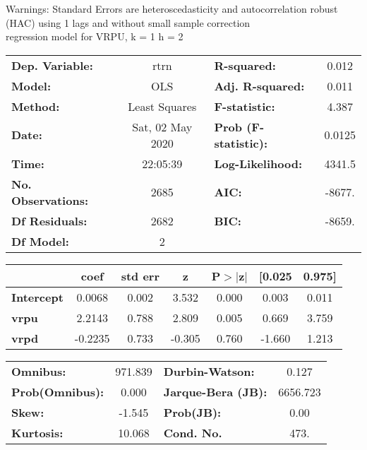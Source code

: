 Warnings: \newline
 [1] Standard Errors are heteroscedasticity and autocorrelation robust (HAC) using 1 lags and without small sample correction\\ 

regression model for VRPU, k = 1 h = 2\begin{center}
\begin{tabular}{lclc}
\toprule
\textbf{Dep. Variable:}    &       rtrn       & \textbf{  R-squared:         } &     0.012   \\
\textbf{Model:}            &       OLS        & \textbf{  Adj. R-squared:    } &     0.011   \\
\textbf{Method:}           &  Least Squares   & \textbf{  F-statistic:       } &     4.387   \\
\textbf{Date:}             & Sat, 02 May 2020 & \textbf{  Prob (F-statistic):} &   0.0125    \\
\textbf{Time:}             &     22:05:39     & \textbf{  Log-Likelihood:    } &    4341.5   \\
\textbf{No. Observations:} &        2685      & \textbf{  AIC:               } &    -8677.   \\
\textbf{Df Residuals:}     &        2682      & \textbf{  BIC:               } &    -8659.   \\
\textbf{Df Model:}         &           2      & \textbf{                     } &             \\
\bottomrule
\end{tabular}
\begin{tabular}{lcccccc}
                   & \textbf{coef} & \textbf{std err} & \textbf{z} & \textbf{P$> |$z$|$} & \textbf{[0.025} & \textbf{0.975]}  \\
\midrule
\textbf{Intercept} &       0.0068  &        0.002     &     3.532  &         0.000        &        0.003    &        0.011     \\
\textbf{vrpu}      &       2.2143  &        0.788     &     2.809  &         0.005        &        0.669    &        3.759     \\
\textbf{vrpd}      &      -0.2235  &        0.733     &    -0.305  &         0.760        &       -1.660    &        1.213     \\
\bottomrule
\end{tabular}
\begin{tabular}{lclc}
\textbf{Omnibus:}       & 971.839 & \textbf{  Durbin-Watson:     } &    0.127  \\
\textbf{Prob(Omnibus):} &   0.000 & \textbf{  Jarque-Bera (JB):  } & 6656.723  \\
\textbf{Skew:}          &  -1.545 & \textbf{  Prob(JB):          } &     0.00  \\
\textbf{Kurtosis:}      &  10.068 & \textbf{  Cond. No.          } &     473.  \\
\bottomrule
\end{tabular}
\end{center}

